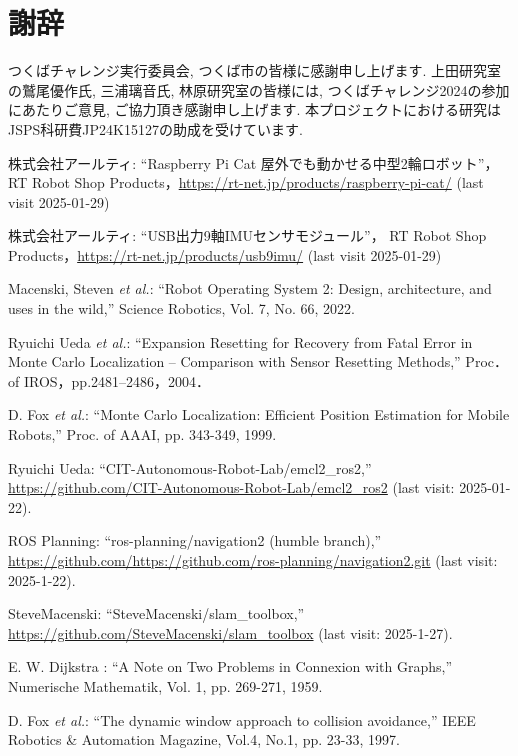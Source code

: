 \documentclass[twocolumn,9pt]{jsproceedings}
\begin{document}
\section*{謝辞}
つくばチャレンジ実行委員会, つくば市の皆様に感謝申し上げます. 
上田研究室の鷲尾優作氏, 三浦璃音氏, 
林原研究室の皆様には, つくばチャレンジ2024の参加にあたりご意見, ご協力頂き感謝申し上げます. 
本プロジェクトにおける研究はJSPS科研費JP24K15127の助成を受けています. 

\footnotesize
\begin{thebibliography}{99}

  株式会社アールティ: ``Raspberry Pi Cat 屋外でも動かせる中型2輪ロボット''，
  RT Robot Shop Products，\url{https://rt-net.jp/products/raspberry-pi-cat/} (last visit 2025-01-29)
  
  株式会社アールティ: ``USB出力9軸IMUセンサモジュール''，
  RT Robot Shop Products，\url{https://rt-net.jp/products/usb9imu/} (last visit 2025-01-29)

  Macenski, Steven {\it et al.}: ``Robot Operating System 2: Design, architecture, and uses in the wild,''
  Science Robotics, Vol. 7, No. 66, 2022.

  Ryuichi Ueda {\it et al.}: 
  ``Expansion Resetting for Recovery from Fatal Error in Monte Carlo Localization -- Comparison with Sensor Resetting Methods,'' Proc．of IROS，pp.2481--2486，2004．
  
  D. Fox {\it et al.}: ``Monte Carlo Localization: Efficient Position Estimation for Mobile Robots,''
  Proc. of AAAI, pp. 343-349, 1999.
  
  Ryuichi Ueda: ``CIT-Autonomous-Robot-Lab/emcl2\_ros2,'' \url{https://github.com/CIT-Autonomous-Robot-Lab/emcl2_ros2} (last visit: 2025-01-22).
  
  ROS Planning: ``ros-planning/navigation2 (humble branch),'' \url{https://github.com/https://github.com/ros-planning/navigation2.git} (last visit: 2025-1-22).

  SteveMacenski: ``SteveMacenski/slam\_toolbox,'' \url{https://github.com/SteveMacenski/slam_toolbox} (last visit: 2025-1-27).

  E. W. Dijkstra : ``A Note on Two Problems in Connexion with Graphs,''
  Numerische Mathematik, Vol. 1, pp. 269-271, 1959.

	D. Fox {\it et al.}: ``The dynamic window approach to collision avoidance,'' 
	IEEE Robotics \& Automation Magazine, Vol.4, No.1, pp. 23-33, 1997.


\end{thebibliography}
\end{document}
